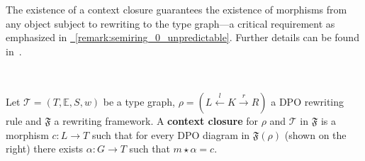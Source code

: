 The existence of a context closure guarantees the existence of morphisms from any object subject to rewriting to the type graph—a critical requirement as emphasized in \hyperref[remark:semiring_0_unpredictable]{\textsection~\ref{remark:semiring_0_unpredictable}}. Further details can be found in~\cite[]{endrullis2024generalized}.
\begin{definition}
    \label{def:context_closure} 
    \ \newline 
\begin{minipage}{0.65\textwidth}
    Let $\mathcal{T} \mathop{=} (T,\mathbb{E}, S, w)$ be a type graph, \(\rho \mathop{=} (L \overset{l}{\leftarrow} K \overset{r}{\rightarrow} R ) \) a DPO rewriting rule and $\mathfrak{F}$ a rewriting framework. 
    A \textbf{context closure} for $\rho$ and $\mathcal{T}$ in $\mathfrak{F}$ is a morphism $c:L \mathop{\rightarrow} T$ such that for every DPO diagram in $\mathfrak{F}(\rho)$ (shown on the right) 
    there exists $\alpha : G \mathop{\rightarrow} T$ such that $m \mathop{\star} \alpha \mathop{=} c$.
\end{minipage}
\begin{minipage}{0.35\textwidth}
    \begin{center}
      \end{center}
\end{minipage}
\end{definition}